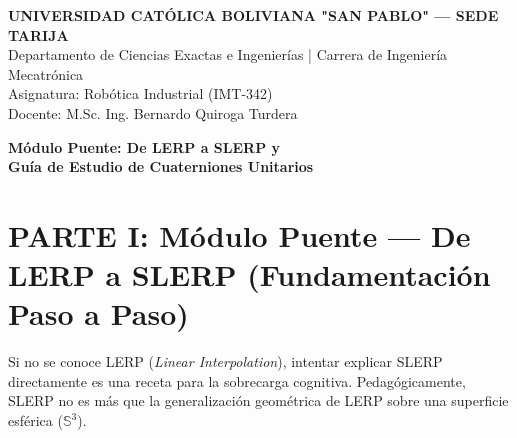 \documentclass[11pt, a4paper]{article}
\begin{document}
\begin{center}
    \Large\textbf{\textcolor{ucbblue}{UNIVERSIDAD CATÓLICA BOLIVIANA "SAN PABLO" — SEDE TARIJA}}\\
    \vspace{0.2cm}
    \normalsize Departamento de Ciencias Exactas e Ingenierías | Carrera de Ingeniería Mecatrónica\\
    Asignatura: Robótica Industrial (IMT-342) \\
    Docente: M.Sc. Ing. Bernardo Quiroga Turdera
\end{center}

\vspace{0.4cm}
\begin{tcolorbox}[colback=ucbblue!5!white, colframe=ucbblue, title=\textbf{Documento de Cátedra: Semana 3 — Sesión 2}]
    \centering \large \textbf{Módulo Puente: De LERP a SLERP y \\ Guía de Estudio de Cuaterniones Unitarios}
\end{tcolorbox}
\vspace{0.4cm}

\section*{PARTE I: Módulo Puente — De LERP a SLERP (Fundamentación Paso a Paso)}

Si no se conoce LERP (\textit{Linear Interpolation}), intentar explicar SLERP directamente es una receta para la sobrecarga cognitiva. Pedagógicamente, SLERP no es más que la generalización geométrica de LERP sobre una superficie esférica ($\mathbb{S}^3$). 
\end{document}
